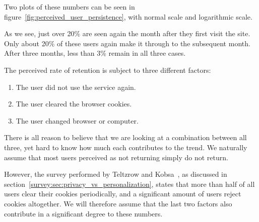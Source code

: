 Two plots of these numbers can be seen in figure~\ref{fig:perceived_user_persistence}, with normal scale and logarithmic scale.

As we see, just over 20\% are seen again the month after they first visit the site. Only about 20\% of these users again make it through to the subsequent month. After three months, less than 3\% remain in all three cases.

The perceived rate of retention is subject to three different factors:

\begin{enumerate}
  \item The user did not use the service again.
  \item The user cleared the browser cookies.
  \item The user changed browser or computer.
\end{enumerate}

There is all reason to believe that we are looking at a combination between all three, yet hard to know how much each contributes to the trend. We naturally assume that most users perceived as not returning simply do not return.

However, the survey performed by Teltzrow and Kobsa~\cite{Teltzrow2004}, as discussed in section~\ref{survey:sec:privacy_vs_personalization}, states that more than half of all users clear their cookies periodically, and a significant amount of users reject cookies altogether. We will therefore assume that the last two factors also contribute in a significant degree to these numbers.

